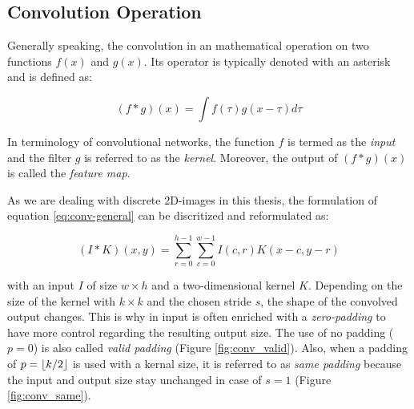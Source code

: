 \subsection{Convolution Operation} \label{sec:conv-op}

Generally speaking, the convolution in an mathematical operation on two functions $f(x)$ and $g(x)$. Its operator is typically denoted with an asterisk \parencite[p. 332]{deep_learning} and is defined as:

\begin{equation} \label{eq:conv-general}
  (f \ast g)(x) = \int f(\tau)g(x-\tau) d\tau
\end{equation}

In terminology of convolutional networks, the function $f$ is termed as the \textit{input} and the filter $g$ is referred to as the \textit{kernel}. Moreover, the output of $ (f \ast g)(x) $ is called the \textit{feature map}.

As we are dealing with discrete 2D-images in this thesis, the formulation of equation \ref{eq:conv-general} can be discritized and reformulated as:

\begin{equation} \label{eq:conv-2d}
  (I \ast K)(x,y) = \sum\limits_{r=0}^{h-1} \sum\limits_{c=0}^{w-1} I(c,r)K(x-c,y-r)
\end{equation}

with an input $ I $ of size $w \times h$ and a two-dimensional kernel $ K $. Depending on the size of the kernel with $ k \times k $ and the chosen stride $ s $, the shape of the convolved output changes. This is why in input is often enriched with a \textit{zero-padding} to have more control regarding the resulting output size. The use of no padding ($p=0$) is also called \textit{valid padding} (Figure \ref{fig:conv_valid}). Also, when a padding of $p=\lfloor k/2\rfloor$ is used with a kernal size, it is referred to as \textit{same padding} because the input and output size stay unchanged in case of $ s=1 $ (Figure \ref{fig:conv_same}). 

